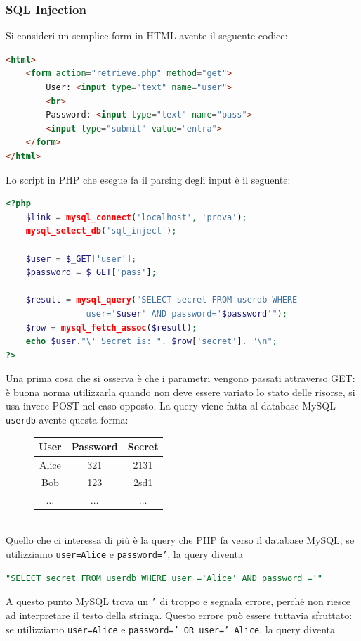 \subsubsection{SQL Injection}
Si consideri un semplice form in HTML avente il seguente codice:
\begin{lstlisting}[language=html]
<html>
	<form action="retrieve.php" method="get">
		User: <input type="text" name="user">
		<br>
		Password: <input type="text" name="pass">
		<input type="submit" value="entra">
	</form>
</html>
\end{lstlisting}
Lo script in PHP che esegue fa il parsing degli input è il seguente:
\begin{lstlisting}[language=php]
<?php
	$link = mysql_connect('localhost', 'prova');
	mysql_select_db('sql_inject');
	
	$user = $_GET['user'];
	$password = $_GET['pass'];
	
	$result = mysql_query("SELECT secret FROM userdb WHERE
				user='$user' AND password='$password'");
	$row = mysql_fetch_assoc($result);
	echo $user."\' Secret is: ". $row['secret']. "\n";
?>
\end{lstlisting}
Una prima cosa che si osserva è che i parametri vengono passati attraverso GET: è buona norma utilizzarla quando non deve essere variato lo stato delle risorse, si usa invece POST nel caso opposto. La query viene fatta al database MySQL \texttt{userdb} avente questa forma:
\begin{figure}[htbp]
	\centering
	\begin{tabular}{|c|c|c|}
		\hline
		\textbf{User} & \textbf{Password} & \textbf{Secret} \\
		\hline
		Alice & 321 & 2131 \\
		\hline
		Bob & 123 & 2sd1 \\
		\hline
		$\dots$ & $\dots$ & $\dots$ \\
		\hline
	\end{tabular}
\end{figure}\\
Quello che ci interessa di più è la query che PHP fa verso il database MySQL; se utilizziamo \texttt{user=Alice} e \texttt{password='}, la query diventa
\begin{lstlisting}[language=sql]
"SELECT secret FROM userdb WHERE user ='Alice' AND password ='"
\end{lstlisting}
A questo punto MySQL trova un \texttt{'} di troppo e segnala errore, perché non riesce ad interpretare il testo della stringa. Questo errore può essere tuttavia sfruttato: se utilizziamo \texttt{user=Alice} e \texttt{password=' OR user=' Alice}, la query diventa
